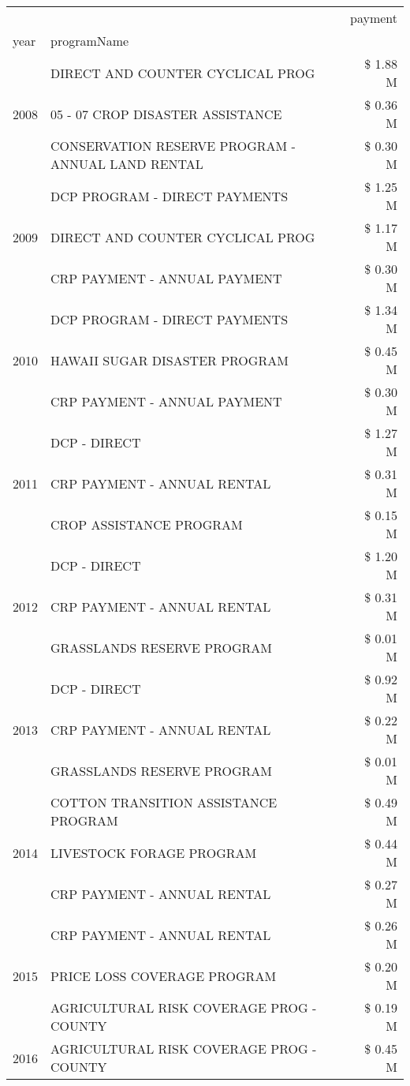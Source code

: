 \begin{tabular}{llr}
\toprule
 &  & payment \\
year & programName &  \\
\midrule
\multirow[t]{3}{*}{2008} & DIRECT AND COUNTER CYCLICAL PROG & \$ 1.88 M \\
 & 05 - 07 CROP DISASTER ASSISTANCE & \$ 0.36 M \\
 & CONSERVATION RESERVE PROGRAM - ANNUAL LAND RENTAL & \$ 0.30 M \\
\cline{1-3}
\multirow[t]{3}{*}{2009} & DCP PROGRAM - DIRECT PAYMENTS & \$ 1.25 M \\
 & DIRECT AND COUNTER CYCLICAL PROG & \$ 1.17 M \\
 & CRP PAYMENT - ANNUAL PAYMENT & \$ 0.30 M \\
\cline{1-3}
\multirow[t]{3}{*}{2010} & DCP PROGRAM - DIRECT PAYMENTS & \$ 1.34 M \\
 & HAWAII SUGAR DISASTER PROGRAM & \$ 0.45 M \\
 & CRP PAYMENT - ANNUAL PAYMENT & \$ 0.30 M \\
\cline{1-3}
\multirow[t]{3}{*}{2011} & DCP - DIRECT & \$ 1.27 M \\
 & CRP PAYMENT - ANNUAL RENTAL & \$ 0.31 M \\
 & CROP ASSISTANCE PROGRAM & \$ 0.15 M \\
\cline{1-3}
\multirow[t]{3}{*}{2012} & DCP - DIRECT & \$ 1.20 M \\
 & CRP PAYMENT - ANNUAL RENTAL & \$ 0.31 M \\
 & GRASSLANDS RESERVE PROGRAM & \$ 0.01 M \\
\cline{1-3}
\multirow[t]{3}{*}{2013} & DCP - DIRECT & \$ 0.92 M \\
 & CRP PAYMENT - ANNUAL RENTAL & \$ 0.22 M \\
 & GRASSLANDS RESERVE PROGRAM & \$ 0.01 M \\
\cline{1-3}
\multirow[t]{3}{*}{2014} & COTTON TRANSITION ASSISTANCE PROGRAM & \$ 0.49 M \\
 & LIVESTOCK FORAGE PROGRAM & \$ 0.44 M \\
 & CRP PAYMENT - ANNUAL RENTAL & \$ 0.27 M \\
\cline{1-3}
\multirow[t]{3}{*}{2015} & CRP PAYMENT - ANNUAL RENTAL & \$ 0.26 M \\
 & PRICE LOSS COVERAGE PROGRAM & \$ 0.20 M \\
 & AGRICULTURAL RISK COVERAGE PROG - COUNTY & \$ 0.19 M \\
\cline{1-3}
\multirow[t]{3}{*}{2016} & AGRICULTURAL RISK COVERAGE PROG - COUNTY & \$ 0.45 M \\

\end{tabular}
